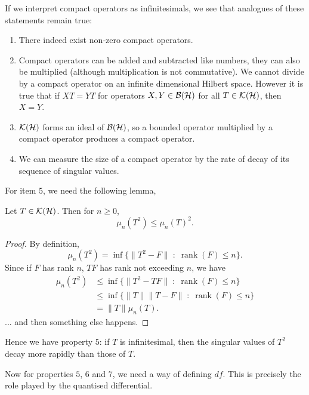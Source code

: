 If we interpret compact operators as infinitesimals, we see that analogues of these statements
remain true:
\begin{enumerate}
    \item{} There indeed exist non-zero compact operators.
    \item{} Compact operators can be added and subtracted like numbers, they can
    also be multiplied (although multiplication is not commutative). We cannot
    divide by a compact operator on an infinite dimensional Hilbert space. However
    it is true that if $XT = YT$ for operators $X,Y \in \mathcal{B}(\mathcal{H})$ for all
    $T \in \mathcal{K}(\mathcal{H})$, then $X = Y$.
    \item{} $\mathcal{K}(\mathcal{H})$ forms an ideal of $\mathcal{B}(\mathcal{H})$, so a bounded
    operator multiplied by a compact operator produces a compact operator.
    \item{} We can measure the size of a compact operator
    by the rate of decay of its sequence of singular values.
\end{enumerate}
For item $5$, we need the following lemma,
\begin{lemma}
    Let $T \in \mathcal{K}(\mathcal{H})$. Then for $n\geq 0$,
    \begin{equation}
        \mu_n(T^2) \leq \mu_n(T)^2.
    \end{equation}
\end{lemma}
\begin{proof}
    By definition,
    \begin{equation}
        \mu_n(T^2) = \inf\{\|T^2-F\|\;:\; \operatorname{rank}(F) \leq n\}.
    \end{equation}
    Since if $F$ has rank $n$, $TF$ has rank not exceeding $n$, we have
    \begin{align}
        \mu_n(T^2) &\leq \inf\{\|T^2-TF\|\;:\;\operatorname{rank}(F) \leq n\}\\
                   &\leq \inf\{\|T\|\|T-F\|\;:\;\operatorname{rank}(F) \leq n\}\\
                   &= \|T\|\mu_n(T).
    \end{align}
    ... and then something else happens.
\end{proof}
Hence we have property $5$: if $T$ is infinitesimal, then the singular values
of $T^2$ decay more rapidly than those of $T$. 

Now for properties $5$, $6$ and $7$, we need a way of defining $df$. This is precisely
the role played by the quantised differential.

